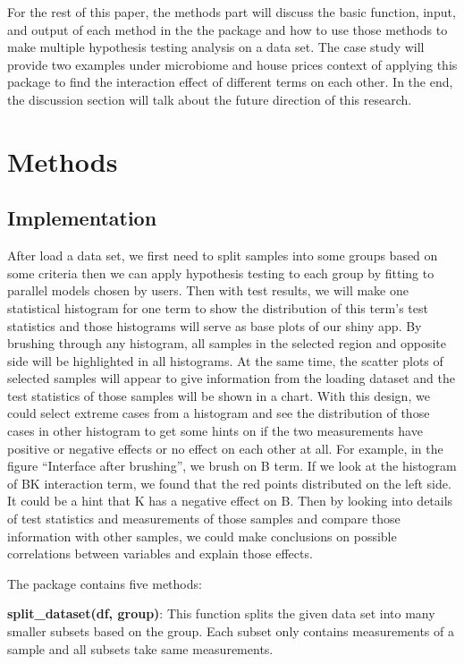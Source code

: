 \documentclass[
]{article}
\begin{document}
For the rest of this paper, the methods part will discuss the basic
function, input, and output of each method in the the package and how to
use those methods to make multiple hypothesis testing analysis on a data
set. The case study will provide two examples under microbiome and house
prices context of applying this package to find the interaction effect
of different terms on each other. In the end, the discussion section
will talk about the future direction of this research.

\hypertarget{methods}{%
\section{Methods}\label{methods}}

\hypertarget{implementation}{%
\subsection{Implementation}\label{implementation}}

After load a data set, we first need to split samples into some groups
based on some criteria then we can apply hypothesis testing to each
group by fitting to parallel models chosen by users. Then with test
results, we will make one statistical histogram for one term to show the
distribution of this term's test statistics and those histograms will
serve as base plots of our shiny app. By brushing through any histogram,
all samples in the selected region and opposite side will be highlighted
in all histograms. At the same time, the scatter plots of selected
samples will appear to give information from the loading dataset and the
test statistics of those samples will be shown in a chart. With this
design, we could select extreme cases from a histogram and see the
distribution of those cases in other histogram to get some hints on if
the two measurements have positive or negative effects or no effect on
each other at all. For example, in the figure ``Interface after
brushing'', we brush on B term. If we look at the histogram of BK
interaction term, we found that the red points distributed on the left
side. It could be a hint that K has a negative effect on B. Then by
looking into details of test statistics and measurements of those
samples and compare those information with other samples, we could make
conclusions on possible correlations between variables and explain those
effects.

The package contains five methods:

\textbf{split\_dataset(df, group)}: This function splits the given data
set into many smaller subsets based on the group. Each subset only
contains measurements of a sample and all subsets take same
measurements.
\end{document}

